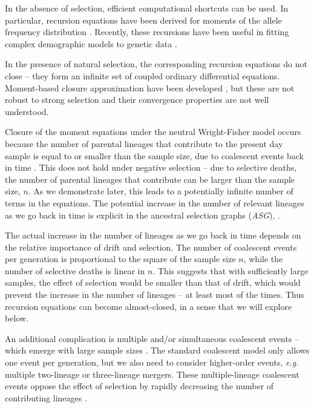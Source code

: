 \documentclass[review]{elsarticle}
\begin{document}
In the absence of selection, efficient computational shortcuts can be used. In
particular, recursion equations have been derived for moments of the allele
frequency distribution \citep{KimuraCrow1964,Ewens1972,JouganousEtAl2017}.
Recently, these recursions have been useful in fitting complex demographic
models to genetic data \citep{JouganousEtAl2017,KammEtAl2017}.
 
In the presence of natural selection, the corresponding recursion equations do
not close \citep{Donnelly, JouganousEtAl2017} -- they form an infinite set of
coupled ordinary differential equations. Moment-based closure approximation
have been developed \citep{JouganousEtAl2017}, but these are not robust to
strong selection and their convergence properties are not well understood.

Closure of the moment equations under the neutral Wright-Fisher model occurs
because the number of parental lineages that contribute to the present day
sample is equal to or smaller than the sample size, due to coalescent events
back in time \citep{Kingman1982a}. This does not hold under negative selection
-- due to selective deaths, the number of parental lineages that contribute can
be larger than the sample size, $n$.  As we demonstrate later, this leads to a
potentially infinite number of terms in the equations. The potential increase in the number of 
relevant lineages as we go back in time is explicit in the ancestral selection graphs 
(\textit{ASG}), \citep{KroneNeuhauser1997}.

The actual increase in the number of lineages as we go back in time depends on the
relative importance of drift and selection. The number of
coalescent events per generation is proportional to the square of the sample size $n$, 
while the number of selective deaths is linear in $n$. This suggests that with sufficiently
large samples, the effect of selection would be smaller than that of drift,
which would prevent the increase in the number of lineages -- at least most of the times.
Thus recursion equations can become almost-closed, in a sense that we will explore below.   


An additional complication is multiple and/or simultaneous coalescent events --
which emerge with large sample sizes \citep{BhaskarEtAl2014}. The standard
coalescent model only allows one event per generation, but we also need to
consider higher-order events, \textit{e.g.} multiple two-lineage or
three-lineage mergers. These multiple-lineage coalescent events oppose the
effect of selection by rapidly decreasing the number of contributing lineages
\citep{NelsonEtAl2019}.
\end{document}
